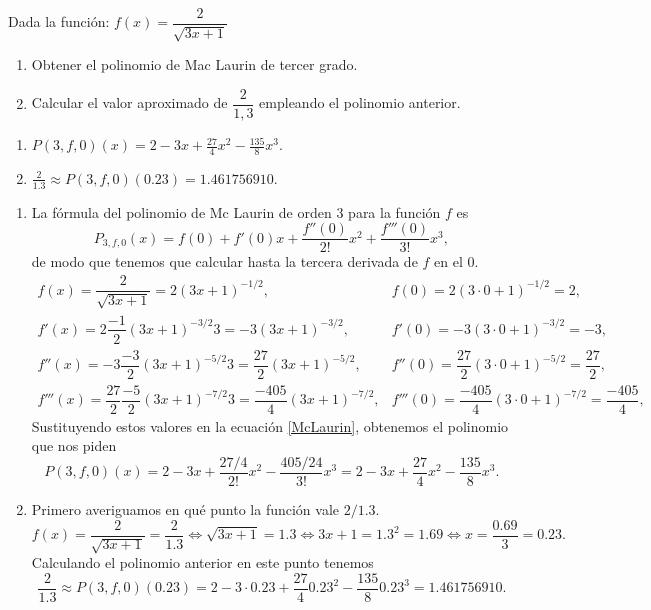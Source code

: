 {Dada la función: $f(x) = \dfrac{2} {{\sqrt {3x+ 1} }}$
\begin{enumerate}
\item Obtener el polinomio de Mac Laurin de tercer grado.
\item Calcular el valor aproximado de $\dfrac{2}{1,3}$ empleando el polinomio anterior.
\end{enumerate}
}
{\begin{enumerate}
\item $P(3,f,0)(x)= 2-3x+\frac{27}{4}x^2-\frac{135}{8}x^3$.
\item $\frac{2}{1.3}\approx P(3,f,0)(0.23)=1.461756910$.
\end{enumerate}
}
{\begin{enumerate}
\item   La fórmula del polinomio de Mc Laurin de orden $3$ para la función $f$ es
\begin{equation}
P_{3,f,0} (x)= f(0)+ f'(0)x+\frac{f''(0)}{2!}x^2+\frac{f'''(0)}{3!}x^3,
\label{McLaurin}
\end{equation}
de modo que tenemos que calcular hasta la tercera derivada de $f$ en el 0.
\[ \renewcommand{\arraystretch}{2}
    \begin{array}{ll}
        f(x)=\dfrac{2}{\sqrt{3x+1}}= 2(3x+1)^{-1/2}, & f(0)=2(3\cdot 0+1)^{-1/2}=2,  \\
        f'(x)=2\dfrac{-1}{2}(3x+1)^{-3/2}3=-3(3x+1)^{-3/2}, &  f'(0)=-3(3\cdot 0+1)^{-3/2}=-3,\\
        f''(x)=-3\dfrac{-3}{2}(3x+1)^{-5/2}3=\dfrac{27}{2}(3x+1)^{-5/2}, &  f''(0)=\dfrac{27}{2}(3\cdot 0+1)^{-5/2}=\dfrac{27}{2},\\
        f'''(x)=\dfrac{27}{2}\dfrac{-5}{2}(3x+1)^{-7/2}3=\dfrac{-405}{4}(3x+1)^{-7/2}, & f'''(0)=\dfrac{-405}{4}(3\cdot 0+1)^{-7/2}=\dfrac{-405}{4},
     \end{array}  
\]
Sustituyendo estos valores en la ecuación \ref{McLaurin}, obtenemos el polinomio que nos piden
\[ 
P(3,f,0)(x)= 2-3x+\frac{27/4}{2!}x^2-\frac{405/24}{3!}x^3=
2-3x+\frac{27}{4}x^2-\frac{135}{8}x^3.      
\]    

\item Primero averiguamos en qué punto la función vale $2/1.3$. 
\[
f(x)=\frac{2}{\sqrt{3x+1}}=\frac{2}{1.3} \Leftrightarrow \sqrt{3x+1}=1.3 \Leftrightarrow
3x+1=1.3^2=1.69 \Leftrightarrow x=\frac{0.69}{3}=0.23.
\]
Calculando el polinomio anterior en este punto tenemos
\[ 
\frac{2}{1.3}\approx P(3,f,0)(0.23)= 2-3\cdot 0.23+\frac{27}{4}0.23^2-\frac{135}{8}0.23^3=1.461756910.      
\]
\end{enumerate}
}


